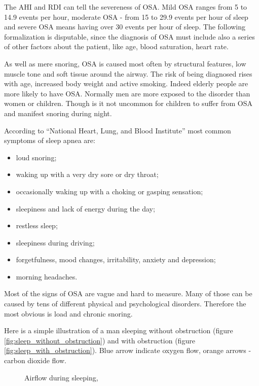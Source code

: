 The AHI and RDI can tell the severeness of OSA. Mild OSA ranges from 5 to 14.9 events per hour, moderate OSA - from 15 to 29.9 events per hour of sleep and severe OSA means having over 30 events per hour of sleep. The following formalization is disputable, since the diagnosis of OSA must include also a series of other factors about the patient, like age, blood saturation, heart rate.

As well as mere snoring, OSA is caused most often by structural features, low muscle tone and soft tissue around the airway. The risk of being diagnosed rises with age, increased body weight and active smoking. Indeed elderly people are more likely to have OSA. Normally men are more exposed to the disorder than women or children. Though is it not uncommon for children to suffer from OSA and manifest snoring during night. 

According to “National Heart, Lung, and Blood Institute” \cite{NHLBI} most common symptoms of sleep apnea are:
\begin{itemize}[topsep=5pt, partopsep=0pt,itemsep=3pt,parsep=1pt]
 \item loud snoring;
 \item waking up with a very dry sore or dry throat;
 \item occasionally waking up with a choking or gasping sensation;
 \item sleepiness and lack of energy during the day;
 \item restless sleep;
 \item sleepiness during driving;
 \item forgetfulness, mood changes, irritability, anxiety and depression;
 \item morning headaches.
\end{itemize}

Most of the signs of OSA are vague and hard to measure. Many of those can be caused by tens of different physical and psychological disorders. Therefore the most obvious is load and chronic snoring.

Here is a simple illustration of a man sleeping without obstruction (figure \ref{fig:sleep_without_obstruction}) and with obstruction (figure \ref{fig:sleep_with_obstruction}). Blue arrow indicate oxygen flow, orange arrows - carbon dioxide flow.

\begin{figure}[!ht]
  \centering
  \vspace{0.08cm}
  \caption{Airflow during sleeping, \cite{surgery}}
  \label{fig:airflow}
\end{figure}


